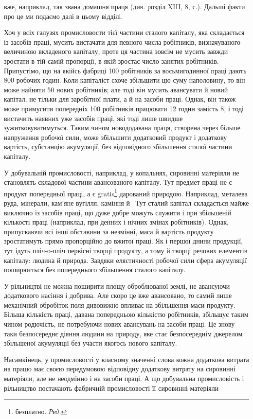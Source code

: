 \parcont{}  %
вже, наприклад, так звана домашня праця (див. розділ XIII,
8, с.). Дальші факти про це ми подаємо далі в цьому відділі.

\enlargethispage{\baselineskip}
Хоч у всіх галузях промисловости тієї частини сталого капіталу,
яка складається із засобів праці, мусить вистачати для
певного числа робітників, визначуваного величиною вкладеного
капіталу, проте ця частина зовсім не мусить завжди зростати в
тій самій пропорції, в якій зростає число занятих робітників.
Припустімо, що на якійсь фабриці 100 робітників за восьмигодинної
праці дають 800 робочих годин. Коли капіталіст схоче
збільшити цю суму наполовину, то він може найняти 50 нових
робітників; але тоді він мусить авансувати й новий капітал,
не тільки для заробітної плати, а й на засоби праці. Однак, він
також може примусити попередніх 100 робітників працювати
12 годин замість 8, і тоді вистачить наявних уже засобів праці,
які тоді лише швидше зужитковуватимуться. Таким чином новододавана
праця, створена через більше напруження робочої сили,
може збільшити додатковий продукт і додаткову вартість, субстанцію
акумуляції, без відповідного збільшення сталої частини
капіталу.

У добувальній промисловості, наприклад, у копальнях, сировинні
матеріяли не становлять складової частини авансованого
капіталу. Тут предмет праці не є продукт попередньої праці, а
є gratis\footnote*{
безплатно. \emph{Ред.}
} дарований природою. Наприклад, металева руда, мінерали,
кам’яне вугілля, каміння й~ Тут сталий капітал складається
майже виключно із засобів праці, що дуже добре можуть
служити і при збільшеній кількості праці (наприклад, при денних
і нічних змінах робітників). Однак, припускаючи всі інші
обставини за незмінні, маса й вартість продукту зростатимуть
прямо пропорційно до вжитої праці. Як і першої днини продукції,
тут ідуть пліч-о-пліч первісні творці продукту, а тому й творці
речових елементів капіталу: людина й природа. Завдяки елястичності
робочої сили сфера акумуляції поширюється без попереднього
збільшення сталого капіталу.

У рільництві не можна поширити площу оброблюваної землі,
не авансуючи додаткового насіння і добрива. Але скоро це вже
авансовано, то самий лише механічний обробіток поля дивовижно
впливає на збільшення маси продукту. Більша кількість
праці, давана попередньою кількістю робітників, збільшує таким
чином родючість, не потребуючи нових авансувань на засоби
праці. Це знову таки безпосереднє діяння людини на природу,
яке стає безпосереднім джерелом збільшеної акумуляції без
участи якогось нового капіталу.

Насамкінець, у промисловості у власному значенні слова
кожна додаткова витрата на працю має своєю передумовою відповідну
додаткову витрату на сировинні матеріяли, але не неодмінно
і на засоби праці. А що добувальна промисловість і рільництво
постачають фабричній промисловості її сировинні матеріяли
\parbreak{}  %

